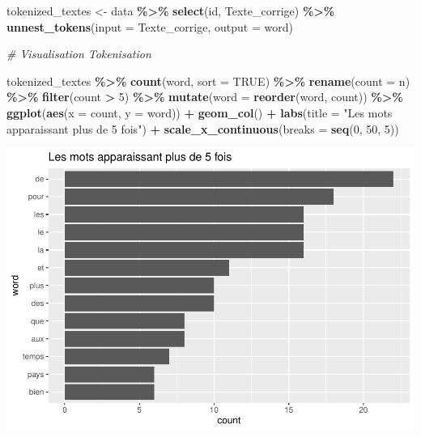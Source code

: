 \documentclass[
]{article}
\newenvironment{Shaded}{\begin{snugshade}}{\end{snugshade}}
\newcommand{\AttributeTok}[1]{\textcolor[rgb]{0.13,0.29,0.53}{#1}}
\newcommand{\CommentTok}[1]{\textcolor[rgb]{0.56,0.35,0.01}{\textit{#1}}}
\newcommand{\ConstantTok}[1]{\textcolor[rgb]{0.56,0.35,0.01}{#1}}
\newcommand{\DecValTok}[1]{\textcolor[rgb]{0.00,0.00,0.81}{#1}}
\newcommand{\FunctionTok}[1]{\textcolor[rgb]{0.13,0.29,0.53}{\textbf{#1}}}
\newcommand{\NormalTok}[1]{#1}
\newcommand{\OtherTok}[1]{\textcolor[rgb]{0.56,0.35,0.01}{#1}}
\newcommand{\SpecialCharTok}[1]{\textcolor[rgb]{0.81,0.36,0.00}{\textbf{#1}}}
\newcommand{\StringTok}[1]{\textcolor[rgb]{0.31,0.60,0.02}{#1}}
\begin{document}
\begin{Shaded}
\begin{Highlighting}[]
\NormalTok{tokenized\_textes }\OtherTok{\textless{}{-}}\NormalTok{ data }\SpecialCharTok{\%\textgreater{}\%}
  \FunctionTok{select}\NormalTok{(id, Texte\_corrige) }\SpecialCharTok{\%\textgreater{}\%}
  \FunctionTok{unnest\_tokens}\NormalTok{(}\AttributeTok{input =} \StringTok{\textquotesingle{}Texte\_corrige\textquotesingle{}}\NormalTok{, }\AttributeTok{output =} \StringTok{\textquotesingle{}word\textquotesingle{}}\NormalTok{)}


\CommentTok{\# Visualisation Tokenisation }

\NormalTok{tokenized\_textes }\SpecialCharTok{\%\textgreater{}\%}
  \FunctionTok{count}\NormalTok{(word, }\AttributeTok{sort =} \ConstantTok{TRUE}\NormalTok{) }\SpecialCharTok{\%\textgreater{}\%}
  \FunctionTok{rename}\NormalTok{(}\AttributeTok{count =}\NormalTok{ n) }\SpecialCharTok{\%\textgreater{}\%}
  \FunctionTok{filter}\NormalTok{(count }\SpecialCharTok{\textgreater{}} \DecValTok{5}\NormalTok{) }\SpecialCharTok{\%\textgreater{}\%}
  \FunctionTok{mutate}\NormalTok{(}\AttributeTok{word =} \FunctionTok{reorder}\NormalTok{(word, count)) }\SpecialCharTok{\%\textgreater{}\%}
  \FunctionTok{ggplot}\NormalTok{(}\FunctionTok{aes}\NormalTok{(}\AttributeTok{x =}\NormalTok{ count, }\AttributeTok{y =}\NormalTok{ word)) }\SpecialCharTok{+} 
  \FunctionTok{geom\_col}\NormalTok{()  }\SpecialCharTok{+} 
  \FunctionTok{labs}\NormalTok{(}\AttributeTok{title =} \StringTok{"Les mots apparaissant plus de 5 fois"}\NormalTok{) }\SpecialCharTok{+} 
  \FunctionTok{scale\_x\_continuous}\NormalTok{(}\AttributeTok{breaks =} \FunctionTok{seq}\NormalTok{(}\DecValTok{0}\NormalTok{, }\DecValTok{50}\NormalTok{, }\DecValTok{5}\NormalTok{))}
\end{Highlighting}
\end{Shaded}

\includegraphics{Texte_mining_files/figure-latex/unnamed-chunk-6-1.pdf}
\end{document}
